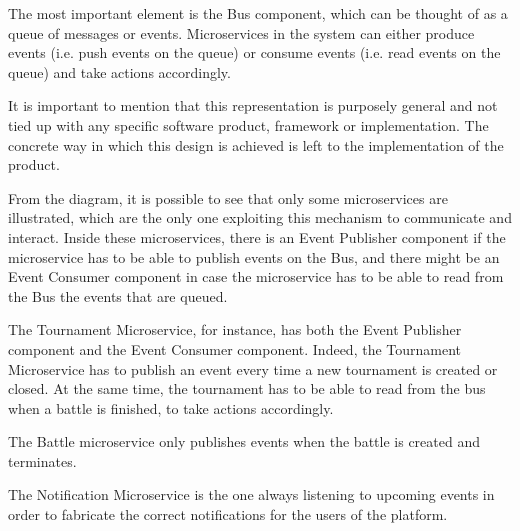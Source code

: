 The most important element is the Bus component, which can be thought of as a queue of messages or events. Microservices in the \app system can either produce events (i.e. push events on the queue) or consume events (i.e. read events on the queue) and take actions accordingly.

It is important to mention that this representation is purposely general and not tied up with any specific software product, framework or implementation. The concrete way in which this design is achieved is left to the implementation of the product.

From the diagram, it is possible to see that only some microservices are illustrated, which are the only one exploiting this mechanism to communicate and interact. 
Inside these microservices, there is an Event Publisher component if the microservice has to be able to publish events on the Bus, and there might be an Event Consumer component in case the microservice has to be able to read from the Bus the events that are queued.

The Tournament Microservice, for instance, has both the Event Publisher component and the Event Consumer component. Indeed, the Tournament Microservice has to publish an event every time a new tournament is created or closed. At the same time, the tournament has to be able to read from the bus when a battle is finished, to take actions accordingly. 

The Battle microservice only publishes events when the battle is created and terminates.

The Notification Microservice is the one always listening to upcoming events in order to fabricate the correct notifications for the users of the \app platform.




